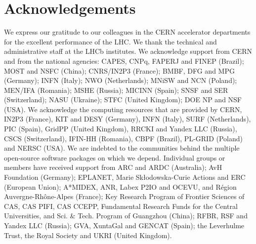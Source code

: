 \section*{Acknowledgements}
%
%
\noindent We express our gratitude to our colleagues in the CERN
accelerator departments for the excellent performance of the LHC. We
thank the technical and administrative staff at the LHCb
institutes.
We acknowledge support from CERN and from the national agencies:
CAPES, CNPq, FAPERJ and FINEP (Brazil); 
MOST and NSFC (China); 
CNRS/IN2P3 (France); 
BMBF, DFG and MPG (Germany); 
INFN (Italy); 
NWO (Netherlands); 
MNiSW and NCN (Poland); 
MEN/IFA (Romania); 
MSHE (Russia); 
MICINN (Spain); 
SNSF and SER (Switzerland); 
NASU (Ukraine); 
STFC (United Kingdom); 
DOE NP and NSF (USA).
We acknowledge the computing resources that are provided by CERN, IN2P3
(France), KIT and DESY (Germany), INFN (Italy), SURF (Netherlands),
PIC (Spain), GridPP (United Kingdom), RRCKI and Yandex
LLC (Russia), CSCS (Switzerland), IFIN-HH (Romania), CBPF (Brazil),
PL-GRID (Poland) and NERSC (USA).
We are indebted to the communities behind the multiple open-source
software packages on which we depend.
Individual groups or members have received support from
ARC and ARDC (Australia);
AvH Foundation (Germany);
EPLANET, Marie Sk\l{}odowska-Curie Actions and ERC (European Union);
A*MIDEX, ANR, Labex P2IO and OCEVU, and R\'{e}gion Auvergne-Rh\^{o}ne-Alpes (France);
Key Research Program of Frontier Sciences of CAS, CAS PIFI, CAS CCEPP, 
Fundamental Research Funds for the Central Universities, 
and Sci. \& Tech. Program of Guangzhou (China);
RFBR, RSF and Yandex LLC (Russia);
GVA, XuntaGal and GENCAT (Spain);
the Leverhulme Trust, the Royal Society
 and UKRI (United Kingdom).


